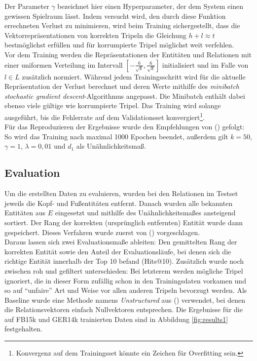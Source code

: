 Der Parameter $\gamma$ bezeichnet hier einen Hyperparameter, der dem System einen gewissen Spielraum lässt. Indem versucht
wird, den durch diese Funktion errechneten Verlust zu minimieren, wird beim Training sichergestellt, dass die Vektorrepräsentationen
von korrekten Tripeln die Gleichung $h + l \approx t$ bestmöglichst erfüllen und für korrumpierte Tripel möglichst weit
verfehlen.\\

Vor dem Training werden die Repräsentationen der Entitäten und Relationen mit einer uniformen Verteilung im Intervall
$[-\frac{6}{\sqrt{k}}, \frac{6}{\sqrt{k}}]$ initialisiert und im Falle von $l \in L$ zusätzlich normiert. Während jedem
Trainingsschritt wird für die aktuelle Repräsentation der Verlust berechnet und deren Werte mithilfe des
\emph{minibatch stochastic gradient descent}-Algorithmus angepasst. Die Minibatch enthält dabei ebenso viele gültige wie korrumpierte Tripel.
Das Training wird solange ausgeführt, bis die Fehlerrate auf dem Validationsset konvergiert\footnote{Konvergenz auf dem
Trainingsset könnte ein Zeichen für Overfitting sein.}.\\

Für das Reproduzieren der Ergebnisse wurde den Empfehlungen von (\cite{bordes2013translating}) gefolgt: So wird das Training
nach maximal 1000 Epochen beendet, außerdem gilt $k = 50$, $\gamma = 1$, $\lambda = 0,01$ und $d_1$ als Unähnlichkeitsmaß.

\subsection{Evaluation}\label{sec:transe-eval}

Um die erstellten Daten zu evaluieren, wurden bei den Relationen im Testset jeweils die Kopf- und Fußentitäten entfernt.
Danach wurden alle bekannten Entitäten aus $E$ eingesetzt und mithilfe des Unähnlichkeitsmaßes ansteigend sortiert. Der Rang
der korrekten (ursprünglich entfernten) Entität wurde dann gespeichert. Dieses Verfahren wurde zuerst von (\cite{bordes2011learning})
vorgeschlagen.\\

Daraus lassen sich zwei Evaluationsmaße ableiten: Den gemittelten Rang der korrekten Entität sowie den Anteil
der Evaluationsläufe, bei denen sich die richtige Entität innerhalb der Top 10 befand (Hits@10). Zusätzlich wurde noch
zwischen roh und gefiltert unterschieden: Bei letzterem werden mögliche Tripel ignoriert, die in dieser Form zufällig schon in
den Trainingsdaten vorkamen und so auf ``unfaire'' Art und Weise vor allen anderen Tripeln bevorzugt werden.
Als Baseline wurde eine Methode namens \emph{Unstructured} aus (\cite{bordes2013translating}) verwendet, bei denen
die Relationsvektoren einfach Nullvektoren entsprechen.
Die Ergebnisse für die auf FB15k und GER14k trainierten Daten sind in Abbildung \ref{fig:results1} festgehalten.

